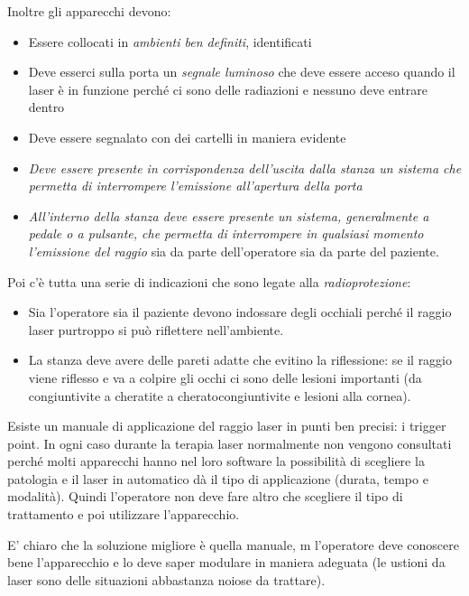 Inoltre gli apparecchi devono:

\begin{itemize}
\item
  Essere collocati in \emph{ambienti ben definiti}, identificati
\item
  Deve esserci sulla porta un \emph{segnale luminoso} che deve essere
  acceso quando il laser è in funzione perché ci sono delle radiazioni e
  nessuno deve entrare dentro
\item
  Deve essere segnalato con dei cartelli in maniera evidente
\item
  \emph{Deve essere presente in corrispondenza dell'uscita dalla stanza
  un sistema che permetta di interrompere l'emissione all'apertura della
  porta}
\item
  \emph{All'interno della stanza deve essere presente un sistema,
  generalmente a pedale o a pulsante, che permetta di interrompere in
  qualsiasi momento l'emissione del raggio} sia da parte dell'operatore
  sia da parte del paziente.
\end{itemize}

Poi c'è tutta una serie di indicazioni che sono legate alla
\emph{radioprotezione}:

\begin{itemize}
\item
  Sia l'operatore sia il paziente devono indossare degli occhiali perché
  il raggio laser purtroppo si può riflettere nell'ambiente.
\item
  La stanza deve avere delle pareti adatte che evitino la riflessione:
  se il raggio viene riflesso e va a colpire gli occhi ci sono delle
  lesioni importanti (da congiuntivite a cheratite a
  cheratocongiuntivite e lesioni alla cornea).
\end{itemize}

Esiste un manuale di applicazione del raggio laser in punti ben precisi:
i trigger point. In ogni caso durante la terapia laser normalmente non
vengono consultati perché molti apparecchi hanno nel loro software la
possibilità di scegliere la patologia e il laser in automatico dà il
tipo di applicazione (durata, tempo e modalità). Quindi l'operatore non
deve fare altro che scegliere il tipo di trattamento e poi utilizzare
l'apparecchio.

E' chiaro che la soluzione migliore è quella manuale, m l'operatore deve
conoscere bene l'apparecchio e lo deve saper modulare in maniera
adeguata (le ustioni da laser sono delle situazioni abbastanza noiose da
trattare).

